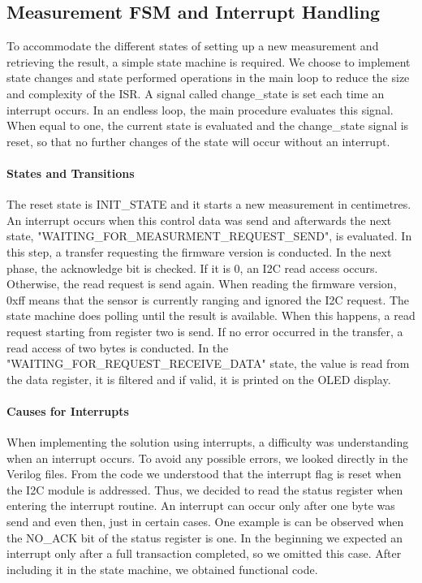 		\subsection{Measurement FSM and Interrupt Handling} %
		\label{sub:measurement_fsm_and_interrupt_handling}
			To accommodate the different states of setting up a new measurement and retrieving the result, a simple state machine is required. We choose to implement state changes and state performed operations in the main loop to reduce the size and complexity of the ISR.
			A signal called change\_state is set each time an interrupt occurs. In an endless loop, the main procedure evaluates this signal. When equal to one, the current state is evaluated and the change\_state signal is reset, so that no further changes of the state will occur without an interrupt.

			\paragraph{States and Transitions} %
			\label{par:states_and_transitions}
				The reset state is INIT\_STATE and it starts a new measurement in centimetres. An interrupt occurs when this control data was send and afterwards the next state, "WAITING\_FOR\_MEASURMENT\_REQUEST\_SEND", is evaluated. In this step, a transfer requesting the firmware version is conducted. In the next phase, the acknowledge bit is checked. If it is 0, an I2C read access occurs. Otherwise, the read request is send again. When reading the firmware version, 0xff means that the sensor is currently ranging and ignored the I2C request. The state machine does polling until the result is available. When this happens, a read request starting from register two is send. If no error occurred in the transfer, a read access of two bytes is conducted. In the "WAITING\_FOR\_REQUEST\_RECEIVE\_DATA" state, the value is read from the data register, it is filtered and if valid, it is printed on the OLED display.
			
			\paragraph{Causes for Interrupts} %
			\label{par:causes_for_interrupts}
				When implementing the solution using interrupts, a difficulty was understanding when an interrupt occurs. To avoid any possible errors, we looked directly in the Verilog files. From the code we understood that the interrupt flag is reset when the I2C module is addressed. Thus, we decided to read the status register when entering the interrupt routine. An interrupt can occur only after one byte was send and even then, just in certain cases. One example is can be observed when the NO\_ACK bit of the status register is one. In the beginning we expected an interrupt only after a full transaction completed, so we omitted this case. After including it in the state machine, we obtained functional code.  
			
